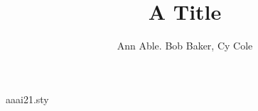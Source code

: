 \begin{filecontents*}[overwrite]{aaai21.sty}
\def\maketitle{\par\begingroup\def\thefootnote{\fnsymbol{footnote}}\twocolumn[\@maketitle]\@thanks\endgroup
  \setcounter{footnote}{0}\let\maketitle\relax\let\@maketitle\relax
  \gdef\@thanks{}\gdef\@author{}\gdef\@title{}\let\thanks\relax}
\def\@maketitle{\newcounter{eqfn}\setcounter{eqfn}{0}%
  \vbox{\let\footnote\thanks\relax\setcounter{footnote}{0}%
    \def\equalcontrib{\ifnum\value{eqfn}=0 \footnote{These authors contributed equally.}%
      \setcounter{eqfn}{\value{footnote}}\else\footnotemark[\value{eqfn}]\fi}%
    \hsize\textwidth\centering{\LARGE\bf\@title\par}\vskip 1em{\Large\bf\@author\par}}}
\end{filecontents*}
\documentclass{article}
\usepackage{aaai21}
\title{A Title}
\author{Ann Able\equalcontrib. Bob Baker\equalcontrib, Cy Cole}

\maketitle
Body.

